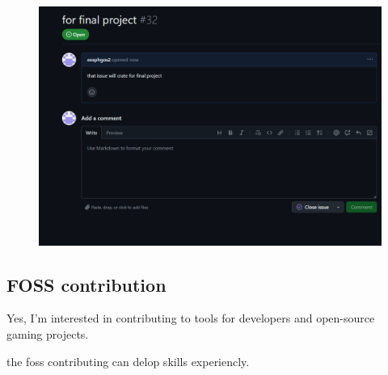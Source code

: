 \documentclass{article}
\begin{document}
\begin{figure}[h]
    \centering
    \includegraphics[width=1\linewidth]{Screenshot 2025-01-20 092658}
\end{figure}

\subsection{FOSS contribution}

Yes, I’m interested in contributing to tools for developers and open-source gaming projects.

the foss contributing can delop skills experiencly.
\end{document}
